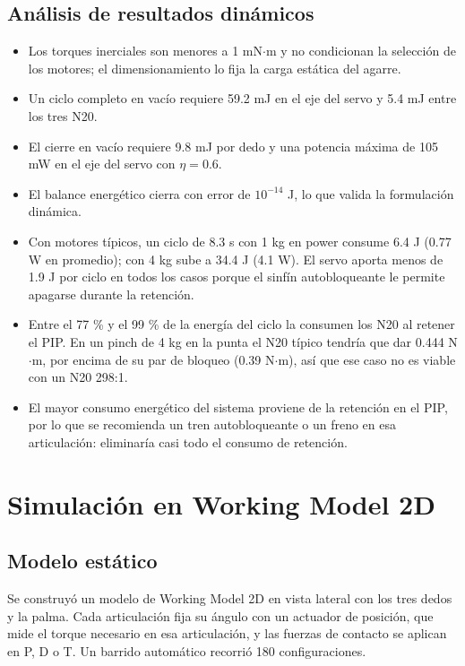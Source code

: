 \documentclass[11pt,letterpaper]{article}
\begin{document}
\subsection{Análisis de resultados dinámicos}
\begin{itemize}
\item Los torques inerciales son menores a 1 mN$\cdot$m y no condicionan la selección de los motores; el dimensionamiento lo fija la carga estática del agarre.
\item Un ciclo completo en vacío requiere 59.2 mJ en el eje del servo y 5.4 mJ entre los tres N20.
\item El cierre en vacío requiere 9.8 mJ por dedo y una potencia máxima de 105 mW en el eje del servo con $\eta = 0.6$.
\item El balance energético cierra con error de $10^{-14}$ J, lo que valida la formulación dinámica.
\item Con motores típicos, un ciclo de 8.3 s con 1 kg en power consume 6.4 J (0.77 W en promedio); con 4 kg sube a 34.4 J (4.1 W). El servo aporta menos de 1.9 J por ciclo en todos los casos porque el sinfín autobloqueante le permite apagarse durante la retención.
\item Entre el 77 \% y el 99 \% de la energía del ciclo la consumen los N20 al retener el PIP. En un pinch de 4 kg en la punta el N20 típico tendría que dar 0.444 N$\cdot$m, por encima de su par de bloqueo (0.39 N$\cdot$m), así que ese caso no es viable con un N20 298:1.
\item El mayor consumo energético del sistema proviene de la retención en el PIP, por lo que se recomienda un tren autobloqueante o un freno en esa articulación: eliminaría casi todo el consumo de retención.
\end{itemize}

\section{Simulación en Working Model 2D}
\subsection{Modelo estático}
Se construyó un modelo de Working Model 2D en vista lateral con los tres dedos y la palma. Cada articulación fija su ángulo con un actuador de posición, que mide el torque necesario en esa articulación, y las fuerzas de contacto se aplican en P, D o T. Un barrido automático recorrió 180 configuraciones.
\end{document}
